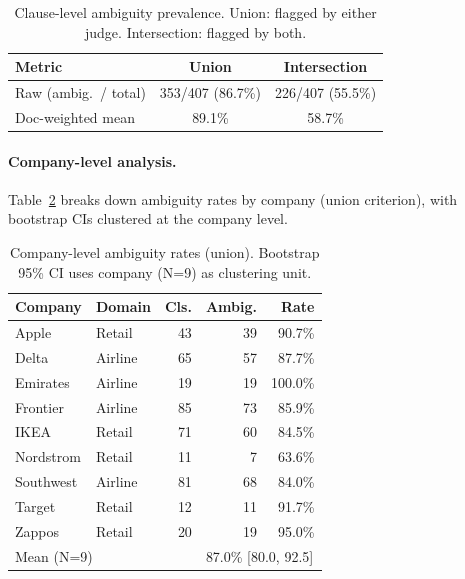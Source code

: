 \begin{table}[!ht]
\centering
\footnotesize
\setlength{\tabcolsep}{4pt}
\begin{tabular}{lcc}
\toprule
\textbf{Metric} & \textbf{Union} & \textbf{Intersection} \\
\midrule
Raw (ambig.\ / total) & 353/407 (86.7\%) & 226/407 (55.5\%) \\
Doc-weighted mean  & 89.1\%  & 58.7\% \\
\bottomrule
\end{tabular}
\caption{Clause-level ambiguity prevalence. Union: flagged by either judge. Intersection: flagged by both.}
\label{tab:clause_prevalence}
\end{table}

\paragraph{Company-level analysis.}
Table~\ref{tab:company_prevalence} breaks down ambiguity rates by company (union criterion), with bootstrap CIs clustered at the company level.

\begin{table}[!ht]
\centering
\footnotesize
\setlength{\tabcolsep}{3.5pt}
\begin{tabular}{llrrr}
\toprule
\textbf{Company} & \textbf{Domain} & \textbf{Cls.} & \textbf{Ambig.} & \textbf{Rate} \\
\midrule
Apple & Retail & 43 & 39 & 90.7\% \\
Delta & Airline & 65 & 57 & 87.7\% \\
Emirates & Airline & 19 & 19 & 100.0\% \\
Frontier & Airline & 85 & 73 & 85.9\% \\
IKEA & Retail & 71 & 60 & 84.5\% \\
Nordstrom & Retail & 11 & 7 & 63.6\% \\
Southwest & Airline & 81 & 68 & 84.0\% \\
Target & Retail & 12 & 11 & 91.7\% \\
Zappos & Retail & 20 & 19 & 95.0\% \\
\midrule
\multicolumn{3}{l}{Mean (N=9)} & \multicolumn{2}{l}{87.0\% [80.0, 92.5]} \\
\bottomrule
\end{tabular}
\caption{Company-level ambiguity rates (union). Bootstrap 95\% CI uses company (N=9) as clustering unit.}
\label{tab:company_prevalence}
\end{table}

